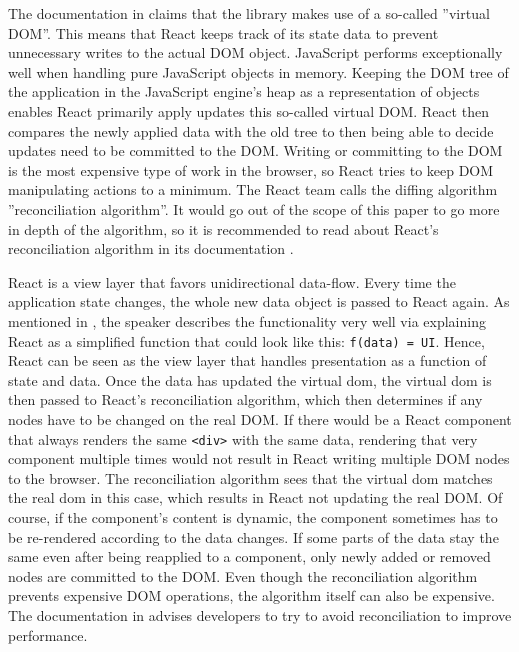 The documentation in \cite[/docs]{React} claims that the library makes use of a so-called ''virtual DOM''. This means that React keeps track of its state data to prevent unnecessary writes to the actual DOM object. JavaScript performs exceptionally well when handling pure JavaScript objects in memory. Keeping the DOM tree of the application in the JavaScript engine's heap as a representation of objects enables React primarily apply updates this so-called virtual DOM. React then compares the newly applied data with the old tree to then being able to decide updates need to be committed to the DOM. Writing or committing to the DOM is the most expensive type of work in the browser, so React tries to keep DOM manipulating actions to a minimum. The React team calls the diffing algorithm ''reconciliation algorithm''. It would go out of the scope of this paper to go more in depth of the algorithm, so it is recommended to read about React's reconciliation algorithm in its documentation \cite[/docs]{React}.

React is a view layer that favors unidirectional data-flow. Every time the application state changes, the whole new data object is passed to React again. As mentioned in \cite[6:50]{ReactFoundingVideo}, the speaker describes the functionality very well via explaining React as a simplified function that could look like this: \texttt{f(data) = UI}. Hence, React can be seen as the view layer that handles presentation as a function of state and data. Once the data has updated the virtual dom, the virtual dom is then passed to React's reconciliation algorithm, which then determines if any nodes have to be changed on the real DOM. If there would be a React component that always renders the same \texttt{<div>} with the same data, rendering that very component multiple times would not result in React writing multiple DOM nodes to the browser. The reconciliation algorithm sees that the virtual dom matches the real dom in this case, which results in React not updating the real DOM. Of course, if the component's content is dynamic, the component sometimes has to be re-rendered according to the data changes. If some parts of the data stay the same even after being reapplied to a component, only newly added or removed nodes are committed to the DOM. Even though the reconciliation algorithm prevents expensive DOM operations, the algorithm itself can also be expensive. The documentation in \cite[/docs/optimizing-performance.html\#avoid-reconciliation]{React} advises developers to try to avoid reconciliation to improve performance.

